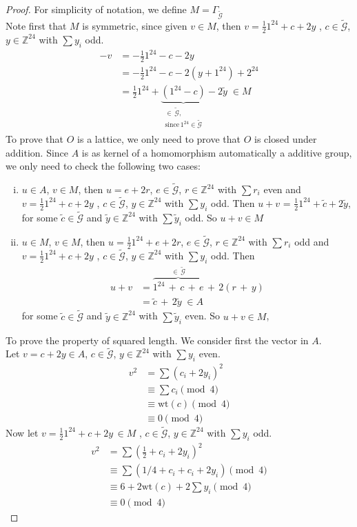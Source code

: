 \documentclass[12pt]{article}
\theoremstyle{definition}
\numberwithin{equation}{theorem}
\numberwithin{figure}{theorem}
\newcommand{\cCodes}{\ensuremath{\widetilde{\mathcal{G}}}}
\newcommand{\buildLattice}[1]{\ensuremath{\Gamma_{#1}}}
\newcommand{\wt}[1]{\ensuremath{\text{wt}(#1)}}
\newcommand{\Integer}{\ensuremath{\mathbb{Z}}}
\begin{document}
\begin{proof}
For simplicity of notation, we define $M = \buildLattice{\cCodes}$\\
Note first that $M$ is symmetric, since given $v \in M$, then $v = \frac{1}{2}1^{24} + c + 2y$ , $c \in \cCodes$, $y \in \Integer^{24}$ with $\sum{y_i}$ odd. 
\begin{align*}	
 -v &= -\frac{1}{2}1^{24} - c - 2y\\
 	&= -\frac{1}{2}1^{24} - c - 2(y + 1^{24}) + 2^{24}\\
 	&= \frac{1}{2}1^{24} + \underbrace{(1^{24} - c)}_{\substack{\in \,\cCodes, \\ \text{since} \, 1^{24} \in \cCodes}} - 2\tilde{y} \;\in M 
\end{align*}
To prove that $O$ is a lattice,  we only need to prove that $O$ is closed under addition. Since $A$ is as kernel of a homomorphism automatically a additive group, we only need to check the following two cases:
\begin{enumerate}[i)]
	\item $u \in A$, $v \in M$, then $u = e + 2r$, $e \in \cCodes$, $r \in \Integer^{24}$ with $\sum r_i $ even and $v = \frac{1}{2}1^{24} + c + 2y$ , $c \in \cCodes$, $y \in \Integer^{24}$ with $\sum{y_i}$ odd. Then $u + v$ = $\frac{1}{2}1^{24} + \tilde{c} + 2\tilde{y}$, for some $\tilde{c} \in \cCodes$ and $\tilde{y} \in \Integer^{24}$ with $\sum{\tilde{y}_i}$ odd. So $u + v \in M$
	\item $u \in M$, $v \in M$, then $u = \frac{1}{2}1^{24}+ e + 2r$, $e \in \cCodes$, $r \in \Integer^{24}$ with $\sum r_i $ odd and $v = \frac{1}{2}1^{24} + c + 2y$ , $c \in \cCodes$, $y \in \Integer^{24}$ with $\sum{y_i}$ odd. Then 
	\begin{align*}
	u + v &= \overbrace{1^{24}\, +\, c \,+ \,e}^{\in \,\cCodes}\, +\, 2(r\, + \,y)\\
		 &= \tilde{c}\, + \,2\tilde{y} \; \in A
	\end{align*}
	for some $\tilde{c} \in \cCodes$ and $\tilde{y} \in \Integer^{24}$ with $\sum{\tilde{y}_i}$ even. So $u + v \in M$, 
\end{enumerate}
To prove the property of squared length. We consider first the vector in $A$.\\
Let $v = c + 2y \in A$, $c \in \cCodes$, $y \in \Integer^{24}$ with $\sum{y_i}$ even.
\begin{align*}
	v^2 &= \sum(c_i + 2y_i)^2 \\
		&\equiv \sum c_i \pmod 4\\
		&\equiv \wt{c} \pmod 4 \\
		&\equiv 0 \pmod 4
\end{align*}
Now let $v = \frac{1}{2}1^{24} + c + 2y \, \in M$ , $c \in \cCodes$, $y \in \Integer^{24}$ with $\sum{y_i}$ odd.
\begin{align*}
	v^2 &= \sum(\frac{1}{2} + c_i + 2y_i)^2 \\
		&\equiv \sum(1/4 + c_i + c_i + 2y_i) \pmod 4\\
		&\equiv 6 + 2\wt{c} + 2\sum{y_i} \pmod 4 \\
		&\equiv 0 \pmod 4
\end{align*}
\end{proof}
\end{document}
